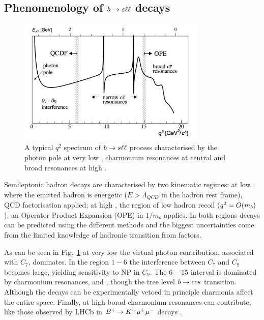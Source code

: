 \subsection{Phenomenology of $b\rightarrow s\ell\ell$ decays}
\label{sec:theo_qsq}

\begin{figure}[h!]
\centering
\includegraphics[width=0.8\textwidth]{fig/q2spectrum.png}
\caption{A typical $q^2$ spectrum of $b\rightarrow s\ell\ell$ process characterised by the photon pole
at very low \qsq, charmonium resonances at central \qsq and broad resonances at high \qsq.}
\label{fig:q2spectrum}
\end{figure}

Semileptonic \bquark hadron decays are characterised by two kinematic regimes: at low \qsq, where the emitted hadron
is energetic ($E > \Lambda_{QCD}$ in the \bquark hadron rest frame), QCD factorisation applied; at high \qsq, the region
of low hadron recoil ($q^2 = O(m_b)$), an Operator Product Expansion (OPE) in $1/m_b$ applies.
In both regions decays can be predicted using the different methods and the biggest uncertainties come
from the limited knowledge of hadronic transition from factors.

As can be seen in Fig.~\ref{fig:q2spectrum} at very low \qsq the virtual photon contribution, associated with $C_7$, dominates.
In the region $1-6$ \gevgevcccc the interference between $C_7$ and $C_9$ becomes large, yielding sensitivity to NP in $C_9$.
The $6-15$ \gevgevcccc interval is dominated by charmonium resonances, \jpsi and \psitwos, though the tree level $b\rightarrow\bar{c} c s$ transition.
Although the decays can be experimentally vetoed in principle charmonia affect the entire \qsq space. 
Finally, at high \qsq borad charmonium resonances can contribute, like those observed by LHCb in $B^+\!\rightarrow K^+\mu^+\mu^-$ decays \cite{}.

